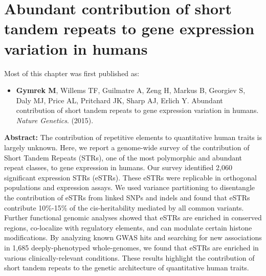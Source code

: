 \chapter{Abundant contribution of short tandem repeats to gene expression variation in humans}
\label{chap:estr}
\hzline

Most of this chapter was first published as:

\begin{itemize}
\item[] \textbf{Gymrek M}, Willems TF, Guilmatre A, Zeng H, Markus B, Georgiev S, Daly MJ, Price AL, Pritchard JK, Sharp AJ, Erlich Y. Abundant contribution of short tandem repeats to gene expression variation in humans. \emph{Nature Genetics}. (2015).
\end{itemize}

\hzline

\textbf{Abstract:} The contribution of repetitive elements to quantitative human traits is largely unknown. Here, we report a genome-wide survey of the contribution of Short Tandem Repeats (STRs), one of the most polymorphic and abundant repeat classes, to gene expression in humans. Our survey identified 2,060 significant expression STRs (eSTRs). These eSTRs were replicable in orthogonal populations and expression assays. We used variance partitioning to disentangle the contribution of eSTRs from linked SNPs and indels and found that eSTRs contribute 10\%-15\% of the cis-heritability mediated by all common variants. Further functional genomic analyses showed that eSTRs are enriched in conserved regions, co-localize with regulatory elements, and can modulate certain histone modifications. By analyzing known GWAS hits and searching for new associations in 1,685 deeply-phenotyped whole-genomes, we found that eSTRs are enriched in various clinically-relevant conditions. These results highlight the contribution of short tandem repeats to the genetic architecture of quantitative human traits.

